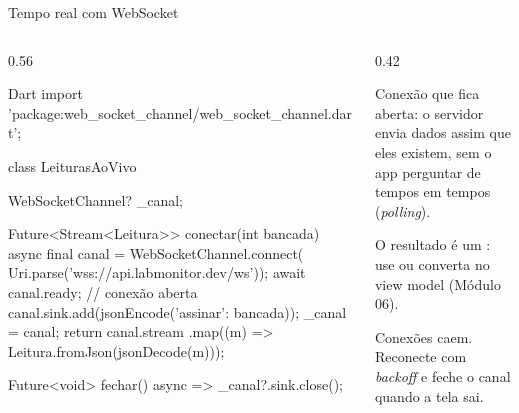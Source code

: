 \documentclass[aspectratio=169,10pt]{beamer}
\begin{document}
\begin{frame}[fragile]{Tempo real com WebSocket}
  \begin{columns}[T]
    \begin{column}{0.56\textwidth}
\begin{codigo}[title=Leituras ao vivo da bancada]{Dart}
import 'package:web_socket_channel/web_socket_channel.dart';

class LeiturasAoVivo {
  WebSocketChannel? _canal;

  Future<Stream<Leitura>> conectar(int bancada) async {
    final canal = WebSocketChannel.connect(
        Uri.parse('wss://api.labmonitor.dev/ws'));
    await canal.ready;                  // conexão aberta
    canal.sink.add(jsonEncode({'assinar': bancada}));
    _canal = canal;
    return canal.stream
        .map((m) => Leitura.fromJson(jsonDecode(m)));
  }

  Future<void> fechar() async => _canal?.sink.close();
}
\end{codigo}
    \end{column}
    \begin{column}{0.42\textwidth}
      \begin{conceito}[WebSocket]
        Conexão que fica aberta: o servidor envia dados assim que eles existem, sem o app perguntar de tempos em tempos (\emph{polling}).
      \end{conceito}
      \begin{dica}
        O resultado é um : use  ou converta no view model (Módulo 06).
      \end{dica}
      \begin{atencao}
        Conexões caem. Reconecte com \emph{backoff} e feche o canal quando a tela sai.
      \end{atencao}
    \end{column}
  \end{columns}
\end{frame}
\end{document}
